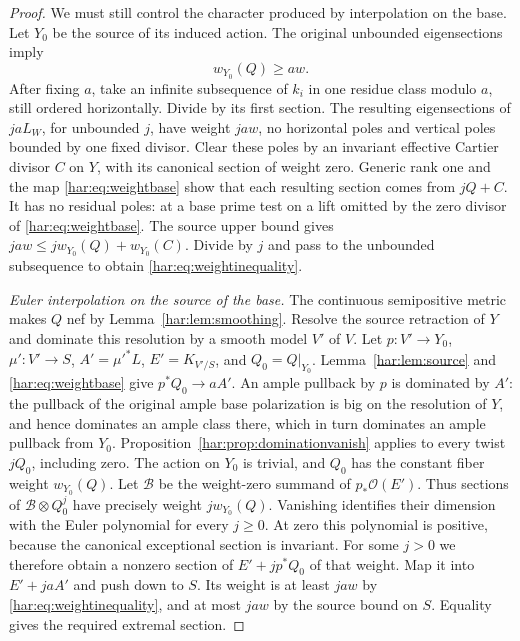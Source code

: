 \begin{proof}
We must still control the character produced by interpolation on the
base. Let \(Y_0\) be the source of its induced action. The original
unbounded eigensections imply
\begin{equation}\label{har:eq:weightinequality}
 w_{Y_0}(Q)\ge aw.
\end{equation}
After fixing \(a\), take an infinite subsequence of \(k_i\) in one
residue class modulo \(a\), still ordered horizontally. Divide by its
first section. The resulting eigensections of \(jaL_W\), for
unbounded \(j\), have weight \(jaw\), no horizontal poles and vertical
poles bounded by one fixed divisor. Clear these poles by an invariant
effective Cartier divisor \(C\) on \(Y\), with its canonical section
of weight zero. Generic rank one and the map
\eqref{har:eq:weightbase} show that each resulting section comes from
\(jQ+C\). It has no residual poles: at a base prime test on a lift
omitted by the zero divisor of \eqref{har:eq:weightbase}. The source
upper bound gives
\(jaw\le j w_{Y_0}(Q)+w_{Y_0}(C)\). Divide by \(j\) and pass to the
unbounded subsequence to obtain \eqref{har:eq:weightinequality}.

\smallskip\noindent\textit{Euler interpolation on the source of the base.}
The continuous semipositive metric makes \(Q\) nef by
Lemma~\ref{har:lem:smoothing}. Resolve the source retraction of \(Y\)
and dominate this resolution by a smooth model \(V'\) of \(V\).
Let \(p:V'\to Y_0\), \(\mu':V'\to S\), \(A'=\mu'^*L\),
\(E'=K_{V'/S}\), and \(Q_0=Q|_{Y_0}\). Lemma~\ref{har:lem:source}
and \eqref{har:eq:weightbase} give
\(p^*Q_0\to aA'\). An ample pullback by \(p\) is dominated by
\(A'\): the pullback of the original ample base polarization is big
on the resolution of \(Y\), and hence dominates an ample class there,
which in turn dominates an ample pullback from \(Y_0\).
Proposition~\ref{har:prop:dominationvanish} applies to every twist
\(jQ_0\), including zero. The action on \(Y_0\) is trivial, and
\(Q_0\) has the constant fiber weight \(w_{Y_0}(Q)\). Let
\(\mathcal B\) be the weight-zero summand of \(p_*\mathcal O(E')\).
Thus sections of \(\mathcal B\otimes Q_0^j\) have precisely weight
\(j w_{Y_0}(Q)\). Vanishing identifies their dimension with the
Euler polynomial for every \(j\ge0\). At zero this polynomial is
positive, because the canonical exceptional section is invariant.
For some \(j>0\) we therefore obtain a nonzero section of
\(E'+jp^*Q_0\) of that weight. Map it into \(E'+jaA'\) and push
down to \(S\). Its weight is at least \(jaw\) by
\eqref{har:eq:weightinequality}, and at most \(jaw\) by the source
bound on \(S\). Equality gives the required extremal section.
\end{proof}

